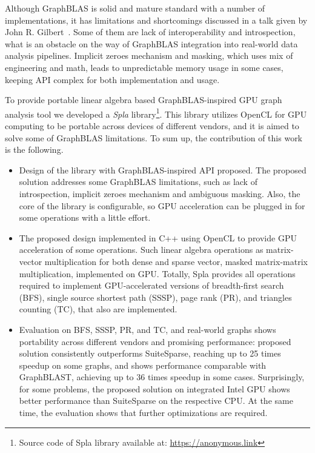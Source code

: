 Although GraphBLAS is solid and mature standard with a number of implementations, it has limitations and shortcomings discussed in a talk given by John R. Gilbert~\cite{talk:graphblas_did_wrong}. Some of them are lack of interoperability and introspection, what is an obstacle on the way of GraphBLAS integration into real-world data analysis pipelines. Implicit zeroes mechanism and masking, which uses mix of engineering and math, leads to unpredictable memory usage in some cases, keeping API complex for both implementation and usage.

To provide portable linear algebra based GraphBLAS-inspired GPU graph analysis tool we developed a \textit{Spla} library\footnote{Source code of Spla library available at: \url{https://anonymous.link}}.
This library utilizes OpenCL for GPU computing to be portable across devices of different vendors, and it is aimed to solve some of GraphBLAS limitations.
To sum up, the contribution of this work is the following.
\begin{itemize}
    \item Design of the library with GraphBLAS-inspired API proposed. The proposed solution addresses some GraphBLAS limitations, such as lack of introspection, implicit zeroes mechanism and ambiguous masking. Also, the core of the library is configurable, so GPU acceleration can be plugged in for some operations with a little effort.
    \item The proposed design implemented in C++ using OpenCL to provide GPU acceleration of some operations. Such linear algebra operations as matrix-vector multiplication for both dense and sparse vector, masked matrix-matrix multiplication, implemented on GPU. Totally, Spla provides all operations required to implement GPU-accelerated versions of breadth-first search (BFS), single source shortest path (SSSP), page rank (PR), and triangles counting (TC), that also are implemented.
    \item Evaluation on BFS, SSSP, PR, and TC, and real-world graphs shows portability across different vendors and promising performance: proposed solution consistently outperforms SuiteSparse, reaching up to 25 times speedup on some graphs, and shows performance comparable with GraphBLAST, achieving up to 36 times speedup in some cases. Surprisingly, for some problems, the proposed solution on integrated Intel GPU shows better performance than SuiteSparse on the respective CPU. At the same time, the evaluation shows that further optimizations are required.
\end{itemize}